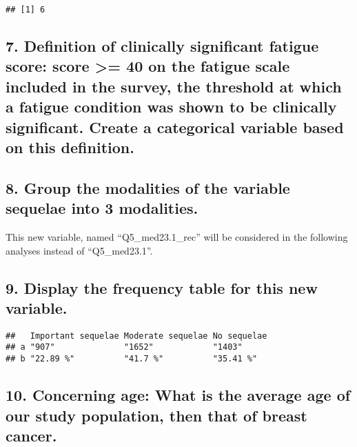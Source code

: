 \documentclass[
]{article}
\begin{document}
\begin{verbatim}
## [1] 6
\end{verbatim}

\hypertarget{definition-of-clinically-significant-fatigue-score-score-40-on-the-fatigue-scale-included-in-the-survey-the-threshold-at-which-a-fatigue-condition-was-shown-to-be-clinically-significant.-create-a-categorical-variable-based-on-this-definition.}{%
\subsection{7. Definition of clinically significant fatigue score: score
\textgreater= 40 on the fatigue scale included in the survey, the
threshold at which a fatigue condition was shown to be clinically
significant. Create a categorical variable based on this
definition.}\label{definition-of-clinically-significant-fatigue-score-score-40-on-the-fatigue-scale-included-in-the-survey-the-threshold-at-which-a-fatigue-condition-was-shown-to-be-clinically-significant.-create-a-categorical-variable-based-on-this-definition.}}

\hypertarget{group-the-modalities-of-the-variable-sequelae-into-3-modalities.}{%
\subsection{8. Group the modalities of the variable sequelae into 3
modalities.}\label{group-the-modalities-of-the-variable-sequelae-into-3-modalities.}}

This new variable, named ``Q5\_med23.1\_rec'' will be considered in the
following analyses instead of ``Q5\_med23.1''.

\hypertarget{display-the-frequency-table-for-this-new-variable.}{%
\subsection{9. Display the frequency table for this new
variable.}\label{display-the-frequency-table-for-this-new-variable.}}

\begin{verbatim}
##   Important sequelae Moderate sequelae No sequelae
## a "907"              "1652"            "1403"     
## b "22.89 %"          "41.7 %"          "35.41 %"
\end{verbatim}

\hypertarget{concerning-age-what-is-the-average-age-of-our-study-population-then-that-of-breast-cancer.}{%
\subsection{10. Concerning age: What is the average age of our study
population, then that of breast
cancer.}\label{concerning-age-what-is-the-average-age-of-our-study-population-then-that-of-breast-cancer.}}
\end{document}
